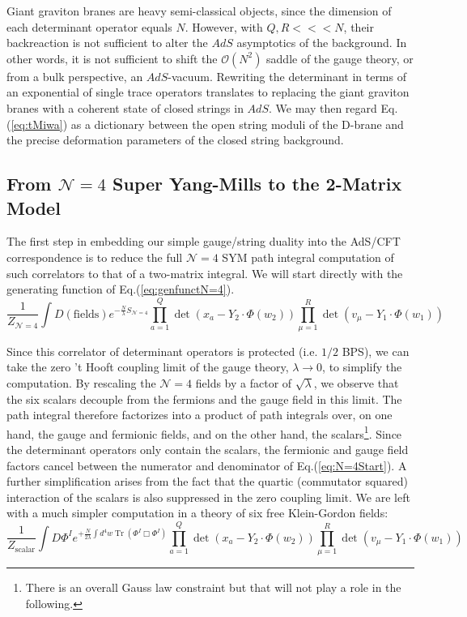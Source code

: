 \documentclass[english]{article}
\DeclareMathOperator{\Tr}{Tr}
\renewcommand{\>}{\rangle}
\newcommand{\<}{\langle}
\renewcommand{\(}{\left(}
\renewcommand{\)}{\right)}
\begin{document}
Giant graviton branes are heavy semi-classical objects, since the dimension of each determinant operator equals $N$. However, with $Q,R <<< N$, their backreaction is not sufficient to alter the $AdS$ asymptotics of the background. In other words, it is not sufficient to shift the $\mathcal{O}(N^2)$ saddle of the gauge theory, or from a bulk perspective, an $AdS$-vacuum. Rewriting the determinant in terms of an exponential of single trace operators translates to replacing the giant graviton branes with a coherent state of closed strings in $AdS$. We may then regard Eq.(\ref{eq:tMiwa}) as a dictionary between the open string moduli of the D-brane and the precise deformation parameters of the closed string background. 



\subsection{From $\mathcal{N}=4$ Super Yang-Mills to the 2-Matrix Model} \label{sec:N=4toMatrixModel}

The first step in embedding our simple gauge/string duality into the AdS/CFT correspondence is to reduce the full $\mathcal{N}=4$ SYM path integral computation of such correlators to that of a two-matrix integral. We will start directly with the generating function of Eq.(\ref{eq:genfunctN=4}). 
\begin{equation}
    \frac{1}{Z_{\mathcal{N}=4}} \int D(\text{fields}) e^{-\frac{N}{\lambda} S_{\mathcal{N}=4}} \prod_{a=1}^{Q} \det \left( x_{a}-Y_2 \cdot \Phi(w_{2}) \right) \prod_{\mu=1}^{R} \det\left(v_{\mu}-Y_1 \cdot \Phi(w_{1}) \right) \label{eq:N=4Start}
\end{equation}

Since this correlator of determinant operators is protected (i.e. $1/2$ BPS), we can take the zero 't Hooft coupling limit of the gauge theory, $\lambda \rightarrow 0 $, to simplify the computation. By rescaling the $\mathcal{N}=4$ fields by a factor of $\sqrt{\lambda}$, we observe that the six scalars decouple from the fermions and the gauge field in this limit. The path integral therefore factorizes into a product of path integrals over, on one hand, the gauge and fermionic fields, and on the other hand, the scalars\footnote{There is an overall Gauss law constraint but that will not play a role in the following.}. Since the determinant operators only contain the scalars, the fermionic and gauge field factors cancel between the numerator and denominator of Eq.(\ref{eq:N=4Start}). A further simplification arises from the fact that the quartic (commutator squared) interaction of the scalars is also suppressed in the zero coupling limit. We are left with a much simpler computation in a theory of six free Klein-Gordon fields:
\begin{equation}
    \frac{1}{Z_{\text{scalar}}} \int D\Phi^{I} e^{+\frac{N}{2\lambda} \int d^{4}w \Tr \left( \Phi^{I} \Box \Phi^{I} \right) } \prod_{a=1}^{Q} \det \left( x_{a}-Y_2 \cdot \Phi(w_{2}) \right) \prod_{\mu=1}^{R} \det\left(v_{\mu}-Y_1 \cdot \Phi(w_{1}) \right)
\end{equation}
\end{document}
